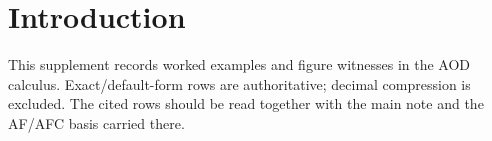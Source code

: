 \section{Introduction}
This supplement records worked examples and figure witnesses in the AOD calculus. Exact/default-form rows are authoritative; decimal compression is excluded. The cited rows should be read together with the main note and the AF/AFC basis carried there.
